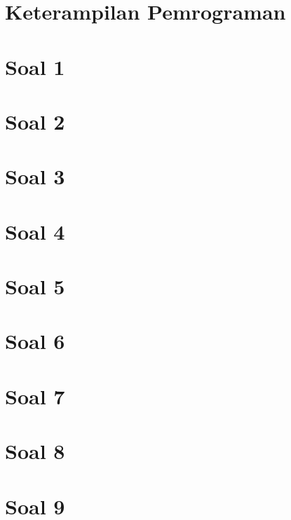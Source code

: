 \documentclass{article}
\begin{document}
\section{Keterampilan Pemrograman}

    \section*{Soal 1}
        
        
    \section*{Soal 2}
        
        
    \section*{Soal 3}
        
    
    \section*{Soal 4}
        
    
    \section*{Soal 5}
        
        
    \section*{Soal 6}
        
        
    \section*{Soal 7}
        
        
    \section*{Soal 8}
        
    
    \section*{Soal 9}
        
    
\end{document}
